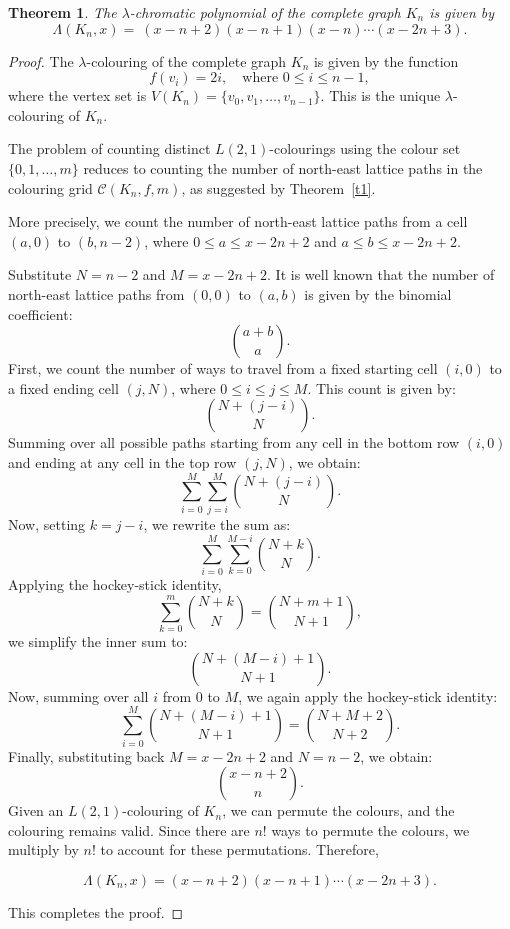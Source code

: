 \documentclass[10pt,a4paper]{amsart}
\newtheorem{theorem}{Theorem}
\begin{document}
\begin{theorem}
\label{LKN}
The \( \lambda \)-chromatic polynomial of the complete graph \( K_n \) is given by
\[
\Lambda(K_n, x) = \ (x - n + 2)(x - n + 1)(x-n) \cdots (x - 2n + 3).
\]
\end{theorem}

\begin{proof}
The $\lambda$-colouring of the complete graph \( K_n \) is given by the function
\[
f(v_i) = 2i, \quad \text{where } 0 \leq i \leq n-1,
\]
where the vertex set is \( V(K_n) = \{v_0, v_1, \dots, v_{n-1}\} \). This is the unique $\lambda$-colouring of \( K_n \).

The problem of counting distinct $L(2,1)$-colourings using the colour set \( \{0,1, \dots, m\} \) reduces to counting the number of north-east lattice paths in the colouring grid \( \mathcal{C}(K_n, f, m) \), as suggested by Theorem~\ref{t1}.

More precisely, we count the number of north-east lattice paths from a cell \( (a,0) \) to \( (b,n-2) \), where \( 0 \leq a \leq x - 2n + 2 \) and \( a \leq b \leq x - 2n + 2 \).

Substitute \( N = n - 2 \) and \( M = x - 2n + 2 \). It is well known that the number of north-east lattice paths from \( (0,0) \) to \( (a,b) \) is given by the binomial coefficient:
\[
\binom{a+b}{a}.
\]
First, we count the number of ways to travel from a fixed starting cell \( (i,0) \) to a fixed ending cell \( (j,N) \), where \( 0 \leq i \leq j \leq M \). This count is given by:
\[
\binom{N+(j-i)}{N}.
\]
Summing over all possible paths starting from any cell in the bottom row \( (i,0) \) and ending at any cell in the top row \( (j,N) \), we obtain:
\[
\sum\limits_{i=0}^{M} \sum\limits_{j=i}^{M} \binom{N+(j-i)}{N}.
\]
Now, setting \( k = j - i \), we rewrite the sum as:
\[
\sum\limits_{i=0}^{M} \sum\limits_{k=0}^{M-i} \binom{N+k}{N}.
\]
Applying the hockey-stick identity,
\[
\sum\limits_{k=0}^{m} \binom{N+k}{N} = \binom{N+m+1}{N+1},
\]
we simplify the inner sum to:
\[
\binom{N+(M-i)+1}{N+1}.
\]
Now, summing over all \( i \) from \( 0 \) to \( M \), we again apply the hockey-stick identity:
\[
\sum\limits_{i=0}^{M} \binom{N+(M-i)+1}{N+1} = \binom{N+M+2}{N+2}.
\]
Finally, substituting back \( M = x- 2n + 2 \) and \( N = n - 2 \), we obtain:
\[
\binom{x-n+2}{n}.
\]
Given an $L(2,1)$-colouring of \( K_n \), we can permute the colours, and the colouring remains valid. Since there are \( n! \) ways to permute the colours, we multiply by \( n! \) to account for these permutations. Therefore,

\[
\Lambda(K_n, x) = (x-n+2)(x-n+1)\cdots (x-2n+3).
\]

 This completes the proof.
\end{proof}
\end{document}
